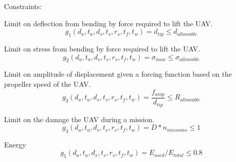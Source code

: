 \documentclass{article}
\begin{document}
	Constraints: \\
	\large
	
	Limit on deflection from bending by force required to lift the UAV. \\
	$$ g_1(d_a,t_a,d_s,t_s,r_s,t_f,t_w) = d_{tip} \le d_{allowable} $$
	
	Limit on stress from bending by force required to lift the UAV. \\
	$$ g_2(d_a,t_a,d_s,t_s,r_s,t_f,t_w) = \sigma_{max} \le \sigma_{allowable} $$
	
	
	Limit on amplitude of displacement given a forcing function based on the propeller speed of the UAV. \\
	$$ g_3(d_a,t_a,d_s,t_s,r_s,t_f,t_w) = \frac{f_{amp}}{d_{tip}} \le R_{allowable} $$
	
	
	Limit on the damage the UAV during a mission. \\
	$$ g_4(d_a,t_a,d_s,t_s,r_s,t_f,t_w) = D * n_{missions} \le 1 $$
	
	Energy
	$$ g_5(d_a,t_a,d_s,t_s,r_s,t_f,t_w) = E_{used} / E_{total} \le 0.8 $$
	
	
	
\end{document}
